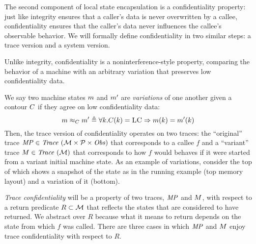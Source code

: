 \documentclass[acmsmall,review,anonymous]{acmart}\settopmatter{printfolios=true,printccs=false,printacmref=false}
\begin{document}
The second component of local state encapsulation is a confidentiality
property: just like integrity ensures that a caller's data is never
overwritten by a callee, confidentiality ensures that the caller's data never
influences the callee's observable behavior. We will formally define
confidentiality in two similar steps: a trace version and a system
version.

Unlike integrity, confidentiality is a noninterference-style property,
comparing the behavior of a machine with an arbitrary variation that
preserves low confidentiality data.

We say two machine states \(m\) and \(m'\) are {\em variations}
of one another given a contour \(C\) if they agree on low
confidentiality data:
%
\[
m \approx_C m' \triangleq \forall k .
C(k) = \textsc{LC} \Rightarrow m(k) =
m'(k)
\]
%
Then, the trace version of confidentiality operates on two traces: the
``original'' trace $\mathit{MP} \in \mathit{Trace}~({\mathcal M} \times \mathcal{P} \times \mathit{Obs})$ that corresponds to a callee $f$
and a ``variant'' trace $M \in \mathit{Trace}~({\mathcal M})$ that corresponds to how $f$
would behaves if it were started from a variant initial machine state.
%
As an example of variations, consider the top of 
which shows a snapshot of the state as in the running example (top
memory layout) and a variation of it (bottom). 


{\em Trace confidentiality} will be a property of two traces, \(\mathit{MP}\) and
\(M\), with respect to a return predicate \(R \subset {\mathcal M}\) that
reflects the states that are considered to have returned. We abstract over
\(R\) because what it means to return depends on the state from which
\(f\) was called. There are three cases in which \(\mathit{MP}\) and \(M\)
enjoy trace confidentiality with respect to \(R\).
\end{document}
